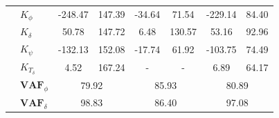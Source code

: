 \begin{table}[]
\begin{tabular}{llcccccc}
                                                   & $K_{\phi} $                                                        & -248.47                                     & 147.39                                              & -34.64                                      & 71.54                                               & -229.14                                     & 84.40                                               \\
                                                   & $K_\delta $                                                        & 50.78                                       & 147.72                                              & 6.48                                        & 130.57                                              & 53.16                                       & 92.96                                               \\
                                                   & $K_\psi $                                                          & -132.13                                     & 152.08                                              & -17.74                                      & 61.92                                               & -103.75                                     & 74.49                                               \\
                                                   & $K_{T_\delta}$                                                     & 4.52                                        & 167.24                                              & -                                           & -                                                   & 6.89                                        & 64.17                                               \\ \cline{2-8} 
                                                   & $\mathbf{VAF}_\phi$                                                & \multicolumn{2}{c}{79.92}                                                                         & \multicolumn{2}{c}{85.93}                                                                         & \multicolumn{2}{c}{80.89}                                                                         \\
                                                   & $\mathbf{VAF}_\delta$                                              & \multicolumn{2}{c}{98.83}                                                                         & \multicolumn{2}{c}{86.40}                                                                         & \multicolumn{2}{c}{97.08}                                                                         \\

\end{tabular}
\end{table}
